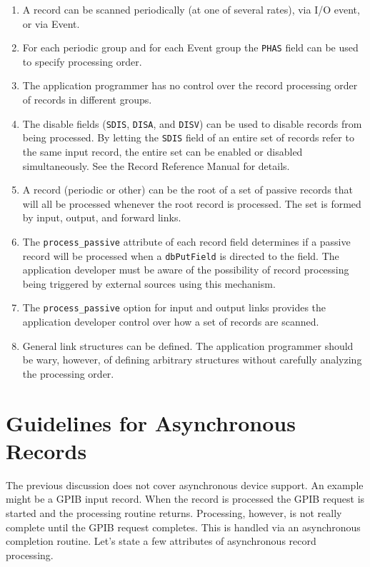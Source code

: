 \begin{enumerate}
\item A record can be scanned periodically (at one of several rates), via I/O event, or via Event.

\item For each periodic group and for each Event group the \verb|PHAS| field can be used to specify processing order.

\item The application programmer has no control over the record processing order of records in different groups.

\item The disable fields (\verb|SDIS|, \verb|DISA|, and \verb|DISV|) can be used to disable records from being processed.
By letting the \verb|SDIS| field of an entire set of records refer to the same input record, the entire set can be enabled or disabled simultaneously.
See the Record Reference Manual for details.

\item A record (periodic or other) can be the root of a set of passive records that will all be processed whenever the root record is processed.
The set is formed by input, output, and forward links.

\item The \verb|process_passive| attribute of each record field determines if a passive record will be processed when a \verb|dbPutField| is directed to the field.
The application developer must be aware of the possibility of record processing being triggered by external sources using this mechanism.

\item The \verb|process_passive| option for input and output links provides the application developer control over how a set of records are scanned.

\item General link structures can be defined.
The application programmer should be wary, however, of defining arbitrary structures without carefully analyzing the processing order. 
\end{enumerate}

\section{Guidelines for Asynchronous Records}

The previous discussion does not cover asynchronous device support.
An example might be a GPIB input record.
When the record is processed the GPIB request is started and the processing routine returns.
Processing, however, is not really complete until the GPIB request completes.
This is handled via an asynchronous completion routine.
Let's state a few attributes of asynchronous record processing.

